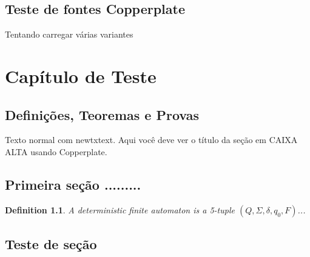\documentclass[10pt,twoside,openright]{memoir}
\theoremstyle{sipserstyle}
\newtheorem{definition}{Definition}[chapter]
\begin{document}
\section*{Teste de fontes Copperplate}

{\Large Tentando carregar várias variantes}

%
%
%
%
%
%
%
%
%
%
%
%
%

\chapter{Capítulo de Teste}
\section{Definições, Teoremas e Provas}

Texto normal com newtxtext. Aqui você deve ver o título da seção
em CAIXA ALTA usando Copperplate.

\newpage
\lipsum[1-3]


\newpage
\section{Primeira seção .........}
\lipsum[4-6]


\begin{definition}
A deterministic finite automaton is a 5-tuple $(Q,\Sigma,\delta,q_0,F)$...
\end{definition}

\section{Teste de seção}
\lipsum[7-8]
\end{document}
